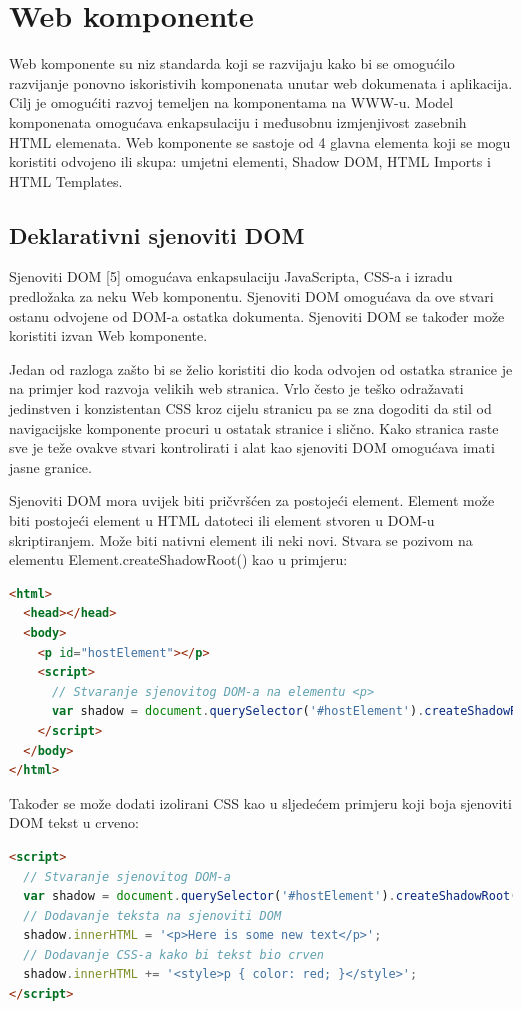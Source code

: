 \documentclass[times, utf8, zavrsni]{fer}
\begin{document}
\section{Web komponente}
Web komponente su niz standarda koji se razvijaju kako bi se omogućilo razvijanje ponovno iskoristivih komponenata unutar web dokumenata i aplikacija. Cilj je omogućiti razvoj temeljen na komponentama na WWW-u. Model komponenata omogućava enkapsulaciju i međusobnu izmjenjivost zasebnih HTML elemenata.
Web komponente se sastoje od 4 glavna elementa koji se mogu koristiti odvojeno ili skupa:
umjetni elementi, Shadow DOM, HTML Imports i HTML Templates.

\subsection{Deklarativni sjenoviti DOM}
Sjenoviti DOM [5] omogućava enkapsulaciju JavaScripta, CSS-a i izradu predložaka za neku Web komponentu. Sjenoviti DOM omogućava da ove stvari ostanu odvojene od DOM-a ostatka dokumenta. Sjenoviti DOM se također može koristiti izvan Web komponente.

Jedan od razloga zašto bi se želio koristiti dio koda odvojen od ostatka stranice je na primjer kod razvoja velikih web stranica. Vrlo često je teško odražavati jedinstven i konzistentan CSS kroz cijelu stranicu pa se zna dogoditi da stil od navigacijske komponente procuri u ostatak stranice i slično. Kako stranica raste sve je teže ovakve stvari kontrolirati i alat kao sjenoviti DOM omogućava imati jasne granice.

Sjenoviti DOM mora uvijek biti pričvršćen za postojeći element. Element može biti postojeći element u HTML datoteci ili element stvoren u DOM-u skriptiranjem. Može biti nativni element ili neki novi. Stvara se pozivom na elementu Element.createShadowRoot() kao u primjeru:

\begin{lstlisting}[language=HTML, basicstyle=\small\linespread{0.8}]
<html>
  <head></head>
  <body>
    <p id="hostElement"></p>
    <script>
      // Stvaranje sjenovitog DOM-a na elementu <p>
      var shadow = document.querySelector('#hostElement').createShadowRoot();
    </script>
  </body>
</html>
\end{lstlisting}

Također se može dodati izolirani CSS kao u sljedećem primjeru koji boja sjenoviti DOM tekst u crveno:

\begin{lstlisting}[language=HTML, basicstyle=\small\linespread{0.8}]
<script>
  // Stvaranje sjenovitog DOM-a
  var shadow = document.querySelector('#hostElement').createShadowRoot();
  // Dodavanje teksta na sjenoviti DOM
  shadow.innerHTML = '<p>Here is some new text</p>';
  // Dodavanje CSS-a kako bi tekst bio crven
  shadow.innerHTML += '<style>p { color: red; }</style>';
</script>
\end{lstlisting}
\end{document}
